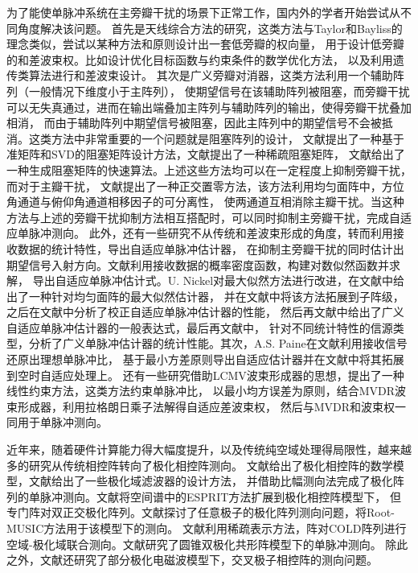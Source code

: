 \documentclass[master]{thesis-uestc}
\begin{document}
为了能使单脉冲系统在主旁瓣干扰的场景下正常工作，国内外的学者开始尝试从不同角度解决该问题。
首先是天线综合方法的研究，这类方法与Taylor和Bayliss的理念类似，尝试以某种方法和原则设计出一套低旁瓣的权向量，
用于设计低旁瓣的和差波束权。比如设计优化目标函数与约束条件的数学优化方法\cite{Bucci,Isernia,Rocca}，
以及利用遗传类算法进行和差波束设计\cite{Lopez,Johnson,Caorsi}。
其次是广义旁瓣对消器\cite{Buckley,Bitzer,Jablon,Zhou}，这类方法利用一个辅助阵列（一般情况下维度小于主阵列），
使期望信号在该辅助阵列被阻塞，而旁瓣干扰可以无失真通过，进而在输出端叠加主阵列与辅助阵列的输出，使得旁瓣干扰叠加相消，
而由于辅助阵列中期望信号被阻塞，因此主阵列中的期望信号不会被抵消。这类方法中非常重要的一个问题就是阻塞阵列的设计，
文献\cite{Fernández}提出了一种基于准矩阵和SVD的阻塞矩阵设计方法，文献\cite{Markovich}提出了一种稀疏阻塞矩阵，
文献\cite{Dai}给出了一种生成阻塞矩阵的快速算法。上述这些方法均可以在一定程度上抑制旁瓣干扰，而对于主瓣干扰，
文献\cite{Yu_00,Yu_01,Yu_16}提出了一种正交置零方法，该方法利用均匀面阵中，方位角通道与俯仰角通道相移因子的可分离性，
使两通道互相消除主瓣干扰。当这种方法与上述的旁瓣干扰抑制方法相互搭配时，可以同时抑制主旁瓣干扰，完成自适应单脉冲测向。
此外，还有一些研究不从传统和差波束形成的角度，转而利用接收数据的统计特性，导出自适应单脉冲估计器，
在抑制主旁瓣干扰的同时估计出期望信号入射方向。文献\cite{Davis}利用接收数据的概率密度函数，构建对数似然函数并求解，
导出自适应单脉冲估计式。U. Nickel对最大似然方法进行改进，在文献\cite{Nickel_93}中给出了一种针对均匀面阵的最大似然估计器，
并在文献\cite{Nickel_96}中将该方法拓展到子阵级，之后在文献\cite{Nickel_99}中分析了校正自适应单脉冲估计器的性能，
然后再文献\cite{Nickel_06}中给出了广义自适应单脉冲估计器的一般表达式，最后再文献\cite{Nickel_11}中，
针对不同统计特性的信源类型，分析了广义单脉冲估计器的统计性能。其次，A.S. Paine在文献\cite{Paine}利用接收信号还原出理想单脉冲比，
基于最小方差原则导出自适应估计器并在文献\cite{Paine_00}中将其拓展到空时自适应处理上。
还有一些研究借助LCMV波束形成器的思想\cite{Hadad}，提出了一种线性约束方法\cite{Cheng,Zhu}，这类方法约束单脉冲比，
以最小均方误差为原则，结合MVDR波束形成器\cite{Wolfel}，利用拉格朗日乘子法解得自适应差波束权，
然后与MVDR和波束权一同用于单脉冲测向。

近年来，随着硬件计算能力得大幅度提升，以及传统纯空域处理得局限性，越来越多的研究从传统相控阵转向了极化相控阵测向。
文献\cite{Friedlander}给出了极化相控阵的数学模型，文献\cite{Ma,Mao_07,Mao_12}给出了一些极化域滤波器的设计方法，
并借助比幅测向法完成了极化阵列的单脉冲测向。文献\cite{Li}将空间谱中的ESPRIT方法扩展到极化相控阵模型下，
但专门阵对双正交极化阵列。文献\cite{Li_04,Wong}探讨了任意极子的极化阵列测向问题，将Root-MUSIC方法用于该模型下的测向。
文献\cite{Si}利用稀疏表示方法，阵对COLD阵列进行空域-极化域联合测向。文献\cite{Gao}研究了圆锥双极化共形阵模型下的单脉冲测向。
除此之外，文献\cite{He}还研究了部分极化电磁波模型下，交叉极子相控阵的测向问题。
\end{document}
